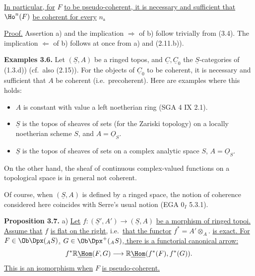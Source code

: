 %
\uline{In particular, for} \(F\) \uline{to be pseudo-coherent, it is necessary and sufficient that} \(\Ho^n(F)\) \uline{be coherent for every} \(n\)\uline{.}

\uline{Proof.} Assertion a) and the implication \(\Rightarrow\) of b) follow trivially from (3.4). The implication \(\Leftarrow\) of b) follows at once from a) and (2.11.b)).

\textbf{Examples 3.6.} Let \((\underline{S},A)\) be a ringed topos, and \(\underline{C},\underline{C}_0\) the \(\underline{S}\)-categories of (1.3.d)) (cf.\ also (2.15)). For the objects of \(\underline{C}_0\) to be coherent, it is necessary and sufficient that \(A\) be coherent (i.e.\ precoherent). Here are examples where this holds:
\begin{itemize}[label=-]
\item \(A\) is constant with value a left noetherian ring (SGA 4 IX 2.1).
\item \(\underline{S}\) is the topos of sheaves of sets (for the Zariski topology) on a locally noetherian scheme \(S\), and \(A=\underline{O}_S\).
\item \(\underline{S}\) is the topos of sheaves of sets on a complex analytic space \(S\), \(A=\underline{O}_S\).
\end{itemize}
On the other hand, the sheaf of continuous complex-valued functions on a topological space is in general not coherent.

Of course, when \((\underline{S},A)\) is defined by a ringed space, the notion of coherence considered here coincides with Serre's usual notion (EGA \(0_I\) 5.3.1).

\textbf{Proposition 3.7.} a) \uline{Let} \(f:(\underline{S}',A')\to(\underline{S},A)\) \uline{be a morphism of ringed topoi. Assume that} \(f\) \uline{is flat on the right,} i.e.\ \uline{that the functor} \(f^*=A'\otimes_A.\) \uline{is exact. For} \(F\in\Ob\Dpx(_A S)\)\uline{,} \(G\in\Ob\Dpx^+(_A S)\)\uline{, there is a functorial canonical arrow:}
\[
  f^*\mathbb{R}\underline{\Hom}(F,G)\longrightarrow\mathbb{R}\underline{\Hom}(f^*(F),f^*(G)).
\]
%
\uline{This is an isomorphism when} \(F\) \uline{is pseudo-coherent.}

